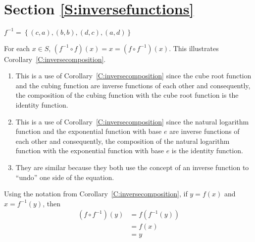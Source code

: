 \section*{Section \ref{S:inversefunctions}}
\renewcommand{\labelenumi}{(\textbf{\alph{enumi}})}

\begin{list}{\bf{\ref{exer:sec65-2}.}}
\item \begin{list}{\bf{(b)}}
\item $f^{ - 1}  = \left\{ {( {c,a} ),( {b,b} ),( {d,c} ),( {a,d} )} \right\}$
\end{list}
\end{list}

\begin{list}{}
\item \begin{list}{\bf{(d)}}
\item For each $x \in S$, $\left( {f^{ - 1}  \circ f} \right)( x ) = x = ( {f \circ f^{ - 1} } )( x )$.  This illustrates \\
Corollary~\ref{C:inversecomposition}.
\end{list}
\end{list}

\begin{list}{\bf{\ref{exer:solveequation}.}}
\item \begin{enumerate}
\item This is a use of Corollary~\ref{C:inversecomposition} since the cube root function and the cubing function are inverse functions of each other and consequently, the composition of the cubing function with the cube root function is the identity function.

\item This is a use of Corollary~\ref{C:inversecomposition} since the natural logarithm function  and the exponential function with base $e$ are inverse functions of each other and consequently, the composition of the natural logarithm function with the exponential function with base $e$ is the identity function.

\item They are similar because they both use the concept of an inverse function to ``undo'' one side of the equation.
\end{enumerate}
\end{list}


\begin{list}{\bf{\ref{exer:inversecomposition}.}}
\item Using the notation from Corollary~\ref{C:inversecomposition}, if $y = f(x)$ and 
$x = f^{-1}(y)$, then
\begin{align*}
\left(f \circ f^{-1} \right) (y) &= f ( f^{-1} ( y ) ) \\
                                 &= f ( x ) \\
                                 &= y
\end{align*}
\end{list}



